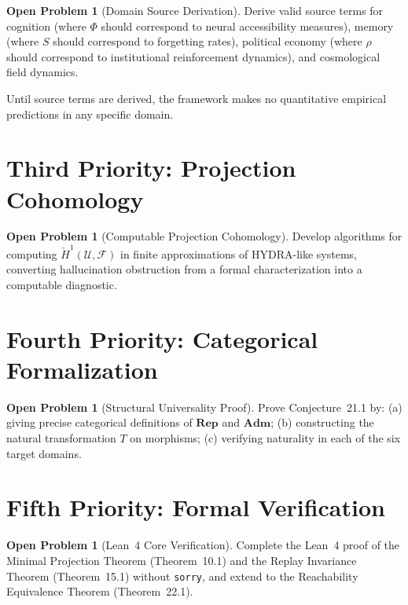 \documentclass[12pt, oneside]{book}
\theoremstyle{flyxion}
\theoremstyle{definition}
\newtheorem{openproblem}[theorem]{Open Problem}
\begin{document}
\begin{openproblem}[Domain Source Derivation]
Derive valid source terms for cognition (where $\Phi$
should correspond to neural accessibility measures),
memory (where $S$ should correspond to forgetting
rates), political economy (where $\rho$ should
correspond to institutional reinforcement dynamics),
and cosmological field dynamics.
\end{openproblem}

Until source terms are derived, the framework makes
no quantitative empirical predictions in any specific
domain.

\section{Third Priority: Projection Cohomology}

\begin{openproblem}[Computable Projection Cohomology]
Develop algorithms for computing $\check{H}^1
(\mathcal{U}, \mathcal{F})$ in finite approximations
of HYDRA-like systems, converting hallucination
obstruction from a formal characterization into a
computable diagnostic.
\end{openproblem}

\section{Fourth Priority: Categorical Formalization}

\begin{openproblem}[Structural Universality Proof]
Prove Conjecture~21.1 by: (a) giving precise categorical
definitions of $\mathbf{Rep}$ and $\mathbf{Adm}$;
(b) constructing the natural transformation $T$ on
morphisms; (c) verifying naturality in each of the six
target domains.
\end{openproblem}

\section{Fifth Priority: Formal Verification}

\begin{openproblem}[Lean~4 Core Verification]
Complete the Lean~4 proof of the Minimal Projection
Theorem (Theorem~10.1) and the Replay Invariance
Theorem (Theorem~15.1) without \texttt{sorry}, and
extend to the Reachability Equivalence Theorem
(Theorem~22.1).
\end{openproblem}
\end{document}
